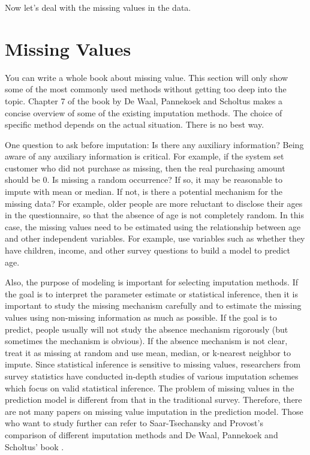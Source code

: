 \documentclass[
  12pt,
]{krantz}
\begin{document}
Now let's deal with the missing values in the data.

\hypertarget{missing-values}{%
\section{Missing Values}\label{missing-values}}

You can write a whole book about missing value. This section will only show some of the most commonly used methods without getting too deep into the topic. Chapter 7 of the book by De Waal, Pannekoek and Scholtus \citep{Ton2011} makes a concise overview of some of the existing imputation methods. The choice of specific method depends on the actual situation. There is no best way.

One question to ask before imputation: Is there any auxiliary information? Being aware of any auxiliary information is critical. For example, if the system set customer who did not purchase as missing, then the real purchasing amount should be 0. Is missing a random occurrence? If so, it may be reasonable to impute with mean or median. If not, is there a potential mechanism for the missing data? For example, older people are more reluctant to disclose their ages in the questionnaire, so that the absence of age is not completely random. In this case, the missing values need to be estimated using the relationship between age and other independent variables. For example, use variables such as whether they have children, income, and other survey questions to build a model to predict age.

Also, the purpose of modeling is important for selecting imputation methods. If the goal is to interpret the parameter estimate or statistical inference, then it is important to study the missing mechanism carefully and to estimate the missing values using non-missing information as much as possible. If the goal is to predict, people usually will not study the absence mechanism rigorously (but sometimes the mechanism is obvious). If the absence mechanism is not clear, treat it as missing at random and use mean, median, or k-nearest neighbor to impute. Since statistical inference is sensitive to missing values, researchers from survey statistics have conducted in-depth studies of various imputation schemes which focus on valid statistical inference. The problem of missing values in the prediction model is different from that in the traditional survey. Therefore, there are not many papers on missing value imputation in the prediction model. Those who want to study further can refer to Saar-Tsechansky and Provost's comparison of different imputation methods \citep{missing1} and De Waal, Pannekoek and Scholtus' book \citep{Ton2011}.
\end{document}
